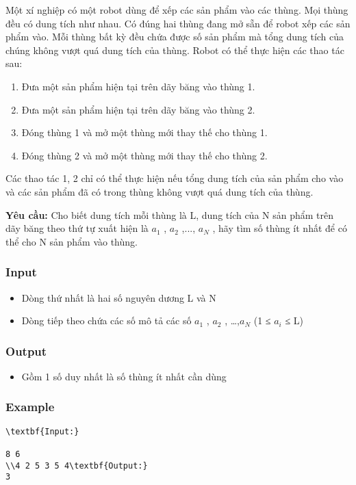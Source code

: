 



   Một xí nghiệp có một robot dùng để xếp các sản phẩm vào các thùng. Mọi thùng đều có dung tích như nhau. Có đúng hai thùng đang mở sẵn để robot xếp các sản phẩm vào. Mỗi thùng bất kỳ đều chứa được số sản phẩm mà tổng dung tích của chúng không vượt quá dung tích của thùng. Robot có thể thực hiện các thao tác sau:  
\begin{enumerate}
	\item     Đưa một sản phẩm hiện tại trên dãy băng vào thùng 1.   
	\item     Đưa một sản phẩm hiện tại trên dãy băng vào thùng 2.   
	\item     Đóng thùng 1 và mở một thùng mới thay thế cho thùng 1.   
	\item     Đóng thùng 2 và mở một thùng mới thay thế cho thùng 2.   
\end{enumerate}

   Các thao tác 1, 2 chỉ có thể thực hiện nếu tổng dung tích của sản phẩm cho vào và các sản phẩm đã có trong thùng không vượt quá dung tích của thùng.  



\textbf{    Yêu cầu:   }   Cho biết dung tích mỗi thùng là L, dung tích của N sản phẩm trên dãy băng theo thứ tự xuất hiện là $a_{1}$   , $a_{2}$   ,..., $a_{N}$   , hãy tìm số thùng ít nhất để có thể cho N sản phẩm vào thùng.  

\subsubsection{   Input  }
\begin{itemize}
	\item     Dòng thứ nhất là hai số nguyên dương L và N   
	\item     Dòng tiếp theo chứa các số mô tả các số $a_{1}$    , $a_{2}$    , …,$a_{N}$    (1 ≤ $a_{i}$    ≤ L)   
\end{itemize}

\subsubsection{   Output  }
\begin{itemize}
	\item     Gồm 1 số duy nhất là số thùng ít nhất cần dùng   
\end{itemize}

\subsubsection{   Example  }
\begin{verbatim}
\textbf{Input:}

8 6
\\4 2 5 3 5 4\textbf{Output:}
3\end{verbatim}

